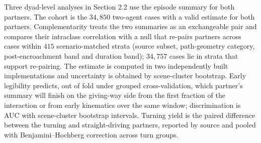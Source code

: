 \documentclass[12pt,a4paper]{article}
\begin{document}
Three dyad-level analyses in Section 2.2 use the episode summary for both partners. The cohort is the
$34{,}850$ two-agent cases with a valid estimate for both partners. Complementarity treats the two
summaries as an exchangeable pair and compares their intraclass correlation with a null that re-pairs
partners across cases within $415$ scenario-matched strata (source subset, path-geometry category,
post-encroachment band and duration band); $34{,}757$ cases lie in strata that support re-pairing.
The estimate is computed in two independently built implementations and uncertainty is obtained by
scene-cluster bootstrap. Early legibility predicts, out of fold under grouped cross-validation, which
partner's summary will finish on the giving-way side from the first fraction of the interaction or
from early kinematics over the same window; discrimination is AUC with scene-cluster bootstrap
intervals. Turning yield is the paired difference between the turning and straight-driving partners,
reported by source and pooled with Benjamini--Hochberg correction across turn groups.
\end{document}
